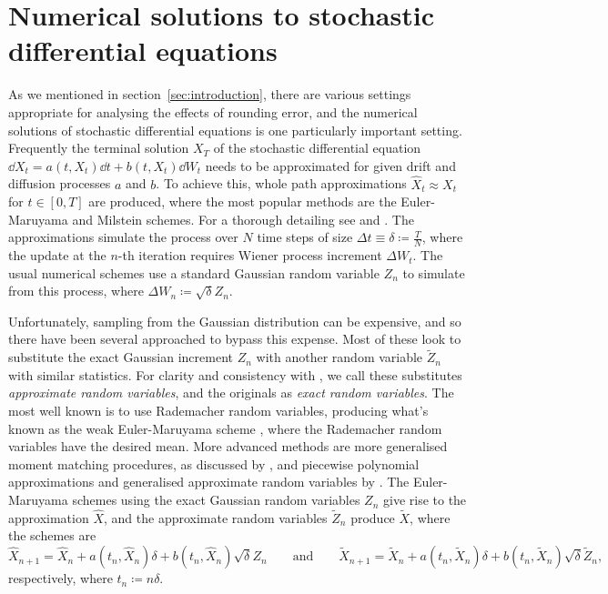 \documentclass[manuscript,review]{acmart}
\begin{document}
\section{Numerical solutions to stochastic differential equations}
\label{sec:numerical_solutions_to_stochastic_differential_equations}

As we mentioned in section~\ref{sec:introduction}, there are various settings appropriate for analysing the effects of rounding error, and the numerical solutions of stochastic differential equations is one particularly important setting. Frequently the terminal solution $ X_T $ of the stochastic differential equation $ \dd{X_t} = a(t, X_t) \dd{t} + b(t, X_t)\dd{W_t} $ needs to be approximated for given drift and diffusion processes $ a $ and $ b $. To achieve this, whole path approximations $ \widehat{X}_t \approx X_t $ for $ t \in [0, T] $ are produced, where the most popular methods are the Euler-Maruyama and Milstein schemes. For a thorough  detailing see \citet{kloeden1999numerical} and \citet{glasserman2013monte}. The approximations simulate the process over $ N $ time steps of size $ \Delta t \equiv \delta \coloneqq \tfrac{T}{N} $, where the update at the $ n $-th iteration requires Wiener process increment $ \Delta W_t $. The usual numerical schemes use a standard Gaussian random variable $ Z_n $ to simulate from this process, where $ \Delta W_n \coloneqq \sqrt{\delta} Z_n $.

Unfortunately, sampling from the Gaussian distribution can be expensive, and so there have been several approached to bypass this expense. Most of these look to substitute the exact Gaussian increment $ Z_n $ with another random variable $ \widetilde{Z}_n $ with similar statistics. For clarity and consistency with \citet{giles2020approximate,sheridan2020approximate_inverse}, we call these substitutes \emph{approximate random variables}, and the originals as \emph{exact random variables}. The most well known is to use Rademacher random variables, producing what's known as the weak Euler-Maruyama scheme \citep[page~XXXII]{kloeden1999numerical}, where the Rademacher random variables have the desired mean. More advanced methods are more generalised moment matching procedures, as discussed by \citet{muller1958inverse}, and piecewise polynomial approximations and generalised approximate random variables by  \citet{giles2020approximate,sheridan2020approximate_inverse}. The Euler-Maruyama schemes using the exact Gaussian random variables $ Z_n $ give rise to the approximation $ \widehat{X} $, and the approximate random variables $ \widetilde{Z}_n $ produce $ \widetilde{X} $, where the schemes are 
\begin{equation*}
\widehat{X}_{n+1} = \widehat{X}_n + a(t_n, \widehat{X}_n) \delta + b(t_n, \widehat{X}_n)\sqrt{\delta} Z_n
\qquad \text{and} \qquad 
\widetilde{X}_{n+1} = \widetilde{X}_n + a(t_n, \widetilde{X}_n) \delta + b(t_n, \widetilde{X}_n)\sqrt{\delta} \widetilde{Z}_n,
\end{equation*}
respectively, where $ t_n \coloneqq n \delta $. 
\end{document}

